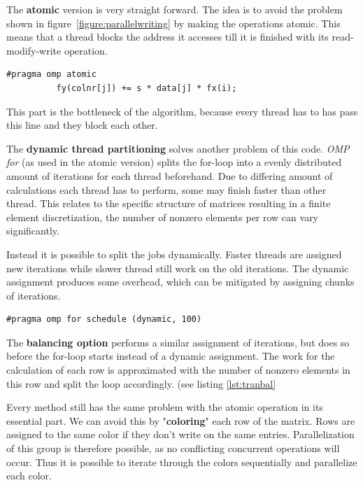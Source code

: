 \documentclass[a4paper,11pt]{scrartcl}
\begin{document}
The \textbf{atomic} version is very straight forward. The idea is to avoid the
problem shown in figure~\ref{figure:parallelwriting} by making the operations
atomic. This means that a thread blocks the address it accesses till it is
finished with its read-modify-write operation.

\begin{lstlisting}
#pragma omp atomic
          fy(colnr[j]) += s * data[j] * fx(i);
\end{lstlisting}

This part is the bottleneck of the algorithm, because every thread has to has
pass this line and they block each other.

The \textbf{dynamic thread partitioning} solves another problem of this code.
{\em OMP for}\/ (as used in the atomic version) splits the for-loop into a
evenly distributed amount of iterations for each thread beforehand. Due to
differing amount of calculations each thread has to perform, some may finish
faster than other thread. This relates to the specific structure of matrices
resulting in a finite element discretization, the number of nonzero elements
per row can vary significantly.

Instead it is possible to split the jobs dynamically. Faster threads are
assigned new iterations while slower thread still work on the old iterations.
The dynamic assignment produces some overhead, which can be mitigated by
assigning chunks of iterations.

\begin{lstlisting}
#pragma omp for schedule (dynamic, 100)
\end{lstlisting}

The \textbf{balancing option} performs a similar assignment of iterations, but
does so before the for-loop starts instead of a dynamic assignment. The work
for the calculation of each row is approximated with the number of nonzero
elements in this row and split the loop accordingly. (see listing \ref{lst:tranbal}



Every method still has the same problem with the atomic operation in its
essential part. We can avoid this by "\textbf{coloring}" each row of the matrix.
Rows are assigned to the same color if they don't write on the same entries.
Parallelization of this group is therefore possible, as no conflicting
concurrent operations will occur. Thus it is possible to iterate through the
colors sequentially and parallelize each color.
\end{document}
